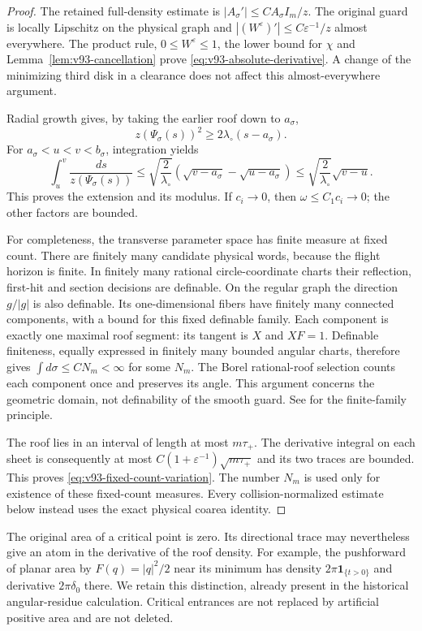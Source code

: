 \begin{proof}
The retained full-density estimate is $|A_\sigma'|\le CA_\sigma I_m/z$.
The original guard is locally Lipschitz on the physical graph and
$|(W^\varepsilon)'|\le C\varepsilon^{-1}/z$ almost everywhere.
The product rule, $0\le W^\varepsilon\le1$, the lower bound for $\chi$
and Lemma~\ref{lem:v93-cancellation} prove
\eqref{eq:v93-absolute-derivative}. A change of the minimizing third
disk in a clearance does not affect this almost-everywhere argument.

Radial growth gives, by taking the earlier roof down to $a_\sigma$,
\[
 z(\Psi_\sigma(s))^2\ge2\lambda_\circ(s-a_\sigma).
\]
For $a_\sigma<u<v<b_\sigma$, integration yields
\[
 \int_u^v\frac{ds}{z(\Psi_\sigma(s))}
 \le\sqrt{\frac2{\lambda_\circ}}
          (\sqrt{v-a_\sigma}-\sqrt{u-a_\sigma})
 \le\sqrt{\frac2{\lambda_\circ}}\sqrt{v-u}.
\]
This proves the extension and its modulus. If $c_i\to0$, then
$\omega\le C_1c_i\to0$; the other factors are bounded.

For completeness, the transverse parameter space has finite measure
at fixed count. There are finitely many candidate physical words,
because the flight horizon is finite. In finitely many rational
circle-coordinate charts their reflection, first-hit and section
decisions are definable. On the regular graph the direction $g/|g|$
is also definable. Its one-dimensional fibers have finitely many
connected components, with a bound for this fixed definable family.
Each component is exactly one maximal roof segment: its tangent is
$X$ and $XF=1$. Definable finiteness, equally expressed in finitely
many bounded angular charts, therefore gives
$\int d\sigma\le C N_m<\infty$ for some $N_m$.
The Borel rational-roof selection counts each component once and
preserves its angle. This argument concerns the geometric domain,
not definability of the smooth guard. See \cite{Coste} for the
finite-family principle.

The roof lies in an interval of length at most $m\tau_+$.
The derivative integral on each sheet is consequently at most
$C(1+\varepsilon^{-1})\sqrt{m\tau_+}$ and its two traces are bounded.
This proves \eqref{eq:v93-fixed-count-variation}. The number $N_m$
is used only for existence of these fixed-count measures. Every
collision-normalized estimate below instead uses the exact physical
coarea identity.
\end{proof}

\begin{remark}
The original area of a critical point is zero. Its directional trace
may nevertheless give an atom in the derivative of the roof density.
For example, the pushforward of planar area by $F(q)=|q|^2/2$ near
its minimum has density $2\pi\mathbf1_{\{t>0\}}$ and derivative
$2\pi\delta_0$ there. We retain this distinction, already present in
the historical angular-residue calculation. Critical entrances are
not replaced by artificial positive area and are not deleted.
\end{remark}
